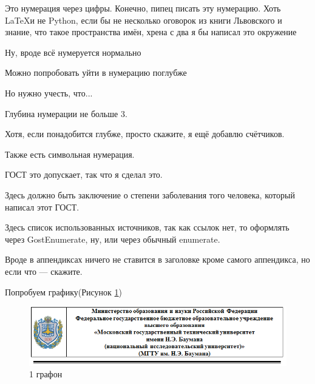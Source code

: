 \documentclass{article}
\begin{document}
\begin{GostEnumerate}
\item Это нумерация через цифры. Конечно, пипец писать эту нумерацию. Хоть \LaTeX и не Python, если бы не несколько оговорок из книги Львовского и знание, что такое пространства имён, хрена с два я бы написал это окружение

\item Ну, вроде всё нумеруется нормально
\begin{GostEnumerate}
\item Можно попробовать уйти в нумерацию поглубже

\item Но нужно учесть, что...

\begin{GostEnumerate}
\item Глубина нумерации не больше 3.

\item Хотя, если понадобится глубже, просто скажите, я ещё добавлю счётчиков.
\end{GostEnumerate}
\end{GostEnumerate}
\end{GostEnumerate}

\begin{GostSymbolEnumerate}
\item Также есть символьная нумерация.

\item ГОСТ это допускает, так что я сделал это.
\end{GostSymbolEnumerate}

\Conclusion

Здесь должно быть заключение о степени заболевания того человека, который написал этот ГОСТ.

\ListSource

Здесь список использованных источников, так как ссылок нет, то оформлять через GostEnumerate, ну, или через обычный enumerate.

\Appendix

Вроде в аппендиксах ничего не ставится в заголовке кроме самого аппендикса, но если что --- скажите.

Попробуем графику(Рисунок \ref{fig:app})

\begin{figure}[h!]
	\centering
	\includegraphics[width=0.7\linewidth]{For_title}
	\caption{1 графон}
	\label{fig:app}
\end{figure}
\end{document}
